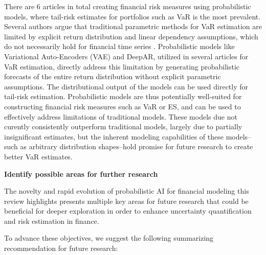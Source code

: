 There are 6 articles in total creating financial risk measures using probabilistic models, where tail-risk estimates for portfolios such as VaR is the most prevalent. Several authors argue that traditional parametric methods for VaR estimation are limited by explicit return distribution and linear dependency assumptions, which do not necessarily hold for financial time series \parencite{arian2022encoded,Fatouros2023DeepVaR}. Probabilistic models like Variational Auto-Encoders (VAE) and DeepAR, utilized in several articles for VaR estimation, directly address this limitation by generating probabilistic forecasts of the entire return distribution without explicit parametric assumptions. The distributional output of the models can be used directly for tail-risk estimation. Probabilistic models are thus potentially well-suited for constructing financial risk measures such as VaR or ES, and can be used to effectively address limitations of traditional models. These models due not curently consistently outperform traditional models, largely due to partially insignificant estimates, but the inherent modeling capabilities of these models--such as arbitrary distribution shapes--hold promise for future research to create better VaR estimates.

\textbf{Identify possible areas for further research}\nopagebreak

The novelty and rapid evolution of probabilistic AI for financial modeling this review highlights presents multiple key areas for future research that could be beneficial for deeper exploration in order to enhance uncertainty quantification and risk estimation in finance. 

To advance these objectives, we suggest the following summarizing recommendation for future research: 


